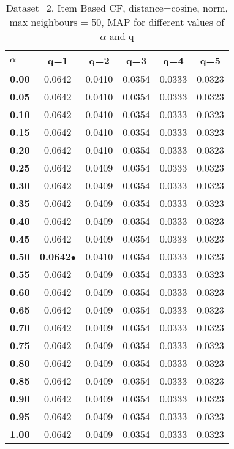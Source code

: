 \begin{table}
\begin{center}
\begin{tabular}{ | l || c | c | c | c | c |}
\hline
\textbf{$\alpha$} & \textbf{q=1} & \textbf{q=2} & \textbf{q=3} & \textbf{q=4} & \textbf{q=5} \\
\hline
\textbf{0.00} & 0.0642 & 0.0410 & 0.0354 & 0.0333 & 0.0323\\
\hline
\textbf{0.05} & 0.0642 & 0.0410 & 0.0354 & 0.0333 & 0.0323\\
\hline
\textbf{0.10} & 0.0642 & 0.0410 & 0.0354 & 0.0333 & 0.0323\\
\hline
\textbf{0.15} & 0.0642 & 0.0410 & 0.0354 & 0.0333 & 0.0323\\
\hline
\textbf{0.20} & 0.0642 & 0.0410 & 0.0354 & 0.0333 & 0.0323\\
\hline
\textbf{0.25} & 0.0642 & 0.0409 & 0.0354 & 0.0333 & 0.0323\\
\hline
\textbf{0.30} & 0.0642 & 0.0409 & 0.0354 & 0.0333 & 0.0323\\
\hline
\textbf{0.35} & 0.0642 & 0.0409 & 0.0354 & 0.0333 & 0.0323\\
\hline
\textbf{0.40} & 0.0642 & 0.0409 & 0.0354 & 0.0333 & 0.0323\\
\hline
\textbf{0.45} & 0.0642 & 0.0409 & 0.0354 & 0.0333 & 0.0323\\
\hline
\textbf{0.50} & \textbf{0.0642}$\bullet$ & 0.0410 & 0.0354 & 0.0333 & 0.0323\\
\hline
\textbf{0.55} & 0.0642 & 0.0409 & 0.0354 & 0.0333 & 0.0323\\
\hline
\textbf{0.60} & 0.0642 & 0.0409 & 0.0354 & 0.0333 & 0.0323\\
\hline
\textbf{0.65} & 0.0642 & 0.0409 & 0.0354 & 0.0333 & 0.0323\\
\hline
\textbf{0.70} & 0.0642 & 0.0409 & 0.0354 & 0.0333 & 0.0323\\
\hline
\textbf{0.75} & 0.0642 & 0.0409 & 0.0354 & 0.0333 & 0.0323\\
\hline
\textbf{0.80} & 0.0642 & 0.0409 & 0.0354 & 0.0333 & 0.0323\\
\hline
\textbf{0.85} & 0.0642 & 0.0409 & 0.0354 & 0.0333 & 0.0323\\
\hline
\textbf{0.90} & 0.0642 & 0.0409 & 0.0354 & 0.0333 & 0.0323\\
\hline
\textbf{0.95} & 0.0642 & 0.0409 & 0.0354 & 0.0333 & 0.0323\\
\hline
\textbf{1.00} & 0.0642 & 0.0409 & 0.0354 & 0.0333 & 0.0323\\
\hline
\end{tabular}
\caption{Dataset\_2, Item Based CF, distance=cosine, norm, max neighbours = 50, MAP for different values of $\alpha$ and q}
\label{table:MAP_Dataset_2_icf_cosine_norm_mnn=50}
\end{center}
\end{table}
